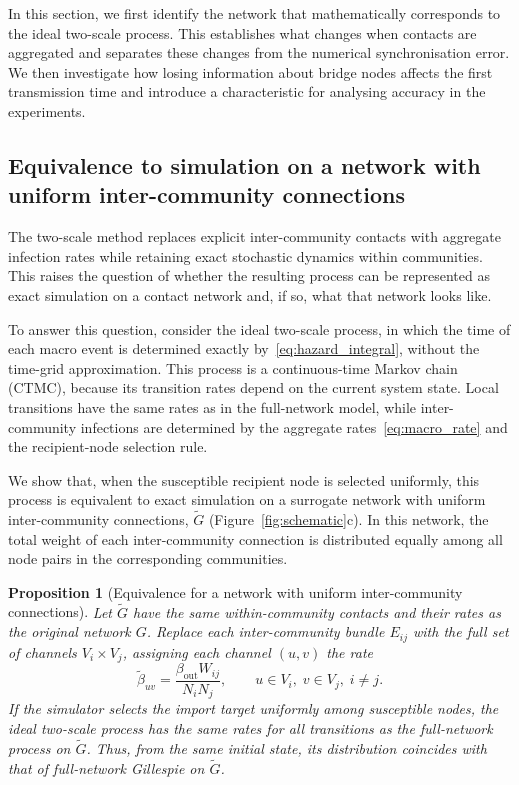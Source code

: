 \documentclass{ieeeaccess}
\newtheorem{proposition}{Proposition}
\begin{document}
In this section, we first identify the network that mathematically corresponds to the ideal two-scale process. This establishes what changes when contacts are aggregated and separates these changes from the numerical synchronisation error. We then investigate how losing information about bridge nodes affects the first transmission time and introduce a characteristic for analysing accuracy in the experiments.

\subsection{Equivalence to simulation on a network with uniform inter-community connections}
\label{sec:surrogate}

The two-scale method replaces explicit inter-community contacts with aggregate infection rates while retaining exact stochastic dynamics within communities. This raises the question of whether the resulting process can be represented as exact simulation on a contact network and, if so, what that network looks like.

To answer this question, consider the ideal two-scale process, in which the time of each macro event is determined exactly by~\eqref{eq:hazard_integral}, without the time-grid approximation. This process is a continuous-time Markov chain (CTMC), because its transition rates depend on the current system state. Local transitions have the same rates as in the full-network model, while inter-community infections are determined by the aggregate rates~\eqref{eq:macro_rate} and the recipient-node selection rule.

We show that, when the susceptible recipient node is selected uniformly, this process is equivalent to exact simulation on a surrogate network with uniform inter-community connections, $\tilde G$ (Figure~\ref{fig:schematic}c). In this network, the total weight of each inter-community connection is distributed equally among all node pairs in the corresponding communities.

\begin{proposition}[Equivalence for a network with uniform inter-community connections]
\label{prop:surrogate}
Let $\tilde G$ have the same within-community contacts and their rates as the original network $G$. Replace each inter-community bundle $E_{ij}$ with the full set of channels $V_i\times V_j$, assigning each channel $(u,v)$ the rate
\[
\tilde\beta_{uv}
=
\frac{\beta_{\mathrm{out}}W_{ij}}{N_iN_j},
\qquad u\in V_i,\;v\in V_j,\;i\neq j.
\]
If the simulator selects the import target uniformly among susceptible nodes, the ideal two-scale process has the same rates for all transitions as the full-network process on $\tilde G$. Thus, from the same initial state, its distribution coincides with that of full-network Gillespie on $\tilde G$.
\end{proposition}
\end{document}
